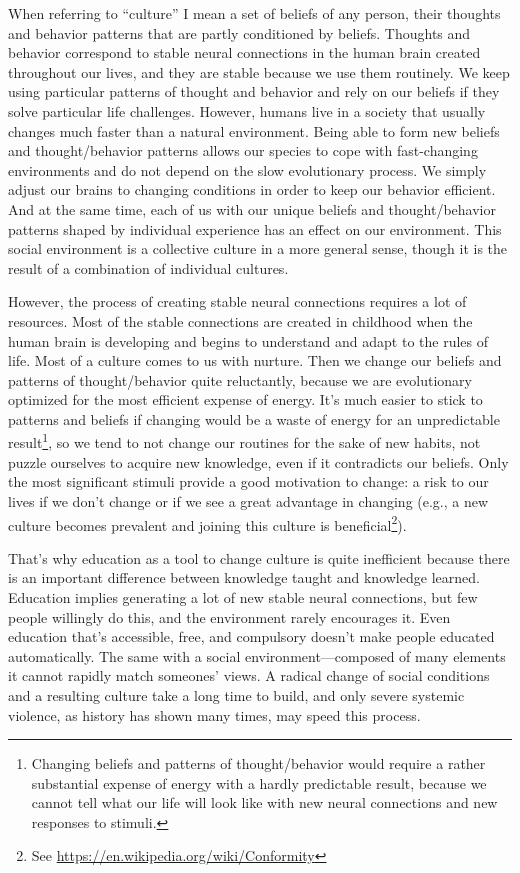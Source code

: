 \documentclass[12pt]{report}
\begin{document}
\noindent When referring to ``culture'' I mean a set of beliefs of any person, their thoughts and behavior patterns that are partly conditioned by beliefs. Thoughts and behavior correspond to stable neural connections in the human brain created throughout our lives, and they are stable because we use them routinely. We keep using particular patterns of thought and behavior and rely on our beliefs if they solve particular life challenges. However, humans live in a society that usually changes much faster than a natural environment. Being able to form new beliefs and thought/behavior patterns allows our species to cope with fast-changing environments and do not depend on the slow evolutionary process. We simply adjust our brains to changing conditions in order to keep our behavior efficient. And at the same time, each of us with our unique beliefs and thought/behavior patterns shaped by individual experience has an effect on our environment. This social environment is a collective culture in a more general sense, though it is the result of a combination of individual cultures.

\noindent However, the process of creating stable neural connections requires a lot of resources. Most of the stable connections are created in childhood when the human brain is developing and begins to understand and adapt to the rules of life. Most of a culture comes to us with nurture. Then we change our beliefs and patterns of thought/behavior quite reluctantly, because we are evolutionary optimized for the most efficient expense of energy. It’s much easier to stick to patterns and beliefs if changing would be a waste of energy for an unpredictable result\footnote{Changing beliefs and patterns of thought/behavior would require a rather substantial expense of energy with a hardly predictable result, because we cannot tell what our life will look like with new neural connections and new responses to stimuli.}, so we tend to not change our routines for the sake of new habits, not puzzle ourselves to acquire new knowledge, even if it contradicts our beliefs. Only the most significant stimuli provide a good motivation to change: a risk to our lives if we don’t change or if we see a great advantage in changing (e.g., a new culture becomes prevalent and joining this culture is beneficial\footnote{See \url{https://en.wikipedia.org/wiki/Conformity}}).

\noindent That’s why education as a tool to change culture is quite inefficient because there is an important difference between knowledge taught and knowledge learned. Education implies generating a lot of new stable neural connections, but few people willingly do this, and the environment rarely encourages it. Even education that’s accessible, free, and compulsory doesn’t make people educated automatically. The same with a social environment\thinspace---\thinspace composed of many elements it cannot rapidly match someones’ views. A radical change of social conditions and a resulting culture take a long time to build, and only severe systemic violence, as history has shown many times, may speed this process.
\end{document}
